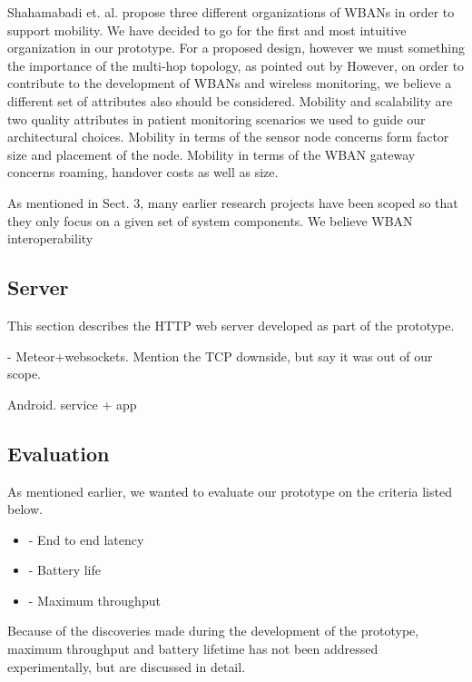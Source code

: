 Shahamabadi et. al. propose three different organizations of WBANs in order to support mobility. We have decided to go for the first and most intuitive organization in our prototype. For a proposed design, however we must something the importance of the multi-hop topology, as pointed out by 
However, on order to contribute to the development of WBANs and wireless monitoring, we believe a different set of attributes also should be considered. Mobility and scalability are two quality attributes in patient monitoring scenarios we used to guide our architectural choices. Mobility in terms of the sensor node concerns form factor size and placement of the node. Mobility in terms of the WBAN gateway concerns roaming, handover costs as well as size.

As mentioned in Sect. 3, many earlier research projects have been scoped so that they only focus on a given set of system components. We believe WBAN interoperability 


\subsection{Server} %
\label{sub:server}

This section describes the HTTP web server developed as part of the prototype. 
 
	- 
Meteor+websockets. Mention the TCP downside, but say it was out of our scope. 

Android. service + app


\subsection{Evaluation} %
\label{sub:evaluation}

As mentioned earlier, we wanted to evaluate our prototype on the criteria listed below.

\begin{itemize}
	\item - End to end latency
	\item - Battery life
	\item - Maximum throughput
\end{itemize}

Because of the discoveries made during the development of the prototype, maximum throughput and battery lifetime has not been addressed experimentally, but are discussed in detail.




